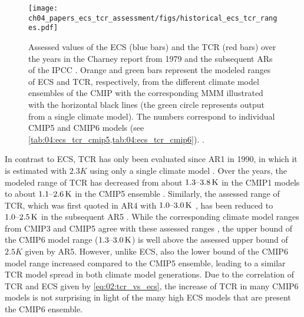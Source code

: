 \begin{figure}[t]
  \centering
  \texttt{[image: 
    ch04\_papers\_ecs\_tcr\_assessment/figs/historical\_ecs\_tcr\_ranges.pdf]}
  \caption{Assessed values of the \acf{ECS} (blue bars) and the \acf{TCR} (red
    bars) over the years in the Charney report from 1979 \autocite{Charney1979}
    and the subsequent \acfp{AR} of the \acf{IPCC} \autocite{Mitchell1990,
      Kattenberg1996, Albritton2001, Solomon2007, Stocker2013}. Orange and
    green bars represent the modeled ranges of \acs{ECS} and \acs{TCR},
    respectively, from the different climate model ensembles of the \acf{CMIP}
    with the corresponding \acf{MMM} illustrated with the horizontal black
    lines (the green circle represents output from a single climate model). The
    numbers correspond to individual \acs{CMIP}5 and \acs{CMIP}6 models (see
    \cref{tab:04:ecs_tcr_cmip5,tab:04:ecs_tcr_cmip6}).
    .}
  \label{fig:04:historical_ecs_tcr_ranges}
\end{figure}

In contrast to \ac{ECS}, \ac{TCR} has only been evaluated since \acs{AR}1 in
1990, in which it is estimated with $2.3 \unit{K}$ using only a single climate
model . Over the years, the modeled range
of \ac{TCR} has decreased from about $\range{1.3}{3.8} \unit{K}$ in the
\acs{CMIP}1 models \autocite{Kattenberg1996} to about $\range{1.1}{2.6}
\unit{K}$ in the \acs{CMIP}5 ensemble \autocite{Flato2013}. Similarly, the
assessed range of \ac{TCR}, which was first quoted in \acs{AR}4 with
$\range{1.0}{3.0} \unit{K}$ \autocite{Solomon2007}, has been reduced to
$\range{1.0}{2.5} \unit{K}$ in the subsequent \acs{AR}5 \autocite{Stocker2013}.
While the corresponding climate model ranges from \acs{CMIP}3 and \acs{CMIP}5
agree with these assessed ranges \autocite{Randall2007, Flato2013}, the upper
bound of the \acs{CMIP}6 model range ($\range{1.3}{3.0} \unit{K}$) is well
above the assessed upper bound of $2.5 \unit{K}$ given by \acs{AR}5. However,
unlike \ac{ECS}, also the lower bound of the \acs{CMIP}6 model range increased
compared to the \acs{CMIP}5 ensemble, leading to a similar \ac{TCR} model
spread in both climate model generations. Due to the correlation of \ac{TCR}
and \ac{ECS} given by \cref{eq:02:tcr_vs_ecs}, the increase of \ac{TCR} in many
\acs{CMIP}6 models is not surprising in light of the many high \ac{ECS} models
that are present the \acs{CMIP}6 ensemble.


